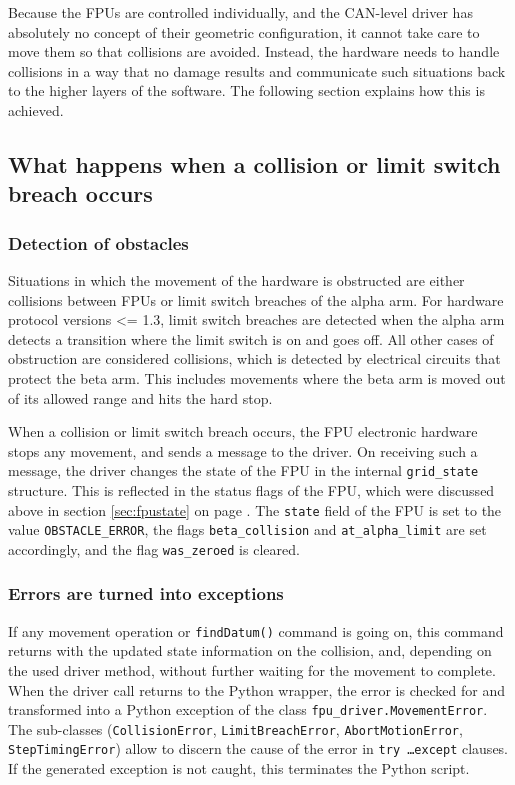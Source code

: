 \documentclass[11pt,a4paper]{scrartcl}
\begin{document}
Because the FPUs are controlled individually, and the CAN-level driver
has absolutely no concept of their geometric configuration, it cannot
take care to move them so that collisions are avoided.  Instead, the
hardware needs to handle collisions in a way that no damage results
and communicate such situations back to the higher layers of the
software. The following section explains how this is achieved.

\subsection{What happens when a collision or limit switch breach occurs}
\subsubsection{Detection of obstacles}

Situations in which the movement of the hardware is obstructed are
either collisions between FPUs or limit switch breaches of the alpha
arm. For hardware protocol versions <= 1.3, limit switch breaches are
detected when the alpha arm detects a transition where the limit
switch is on and goes off. All other cases of obstruction are
considered collisions, which is detected by electrical circuits that
protect the beta arm. This includes movements where the beta arm is
moved out of its allowed range and hits the hard stop.

When a collision or limit switch breach occurs, the FPU electronic
hardware stops any movement, and sends a message to the driver. On
receiving such a message, the driver changes the state of the FPU in
the internal \texttt{grid\_state} structure. This is reflected in the
status flags of the FPU, which were discussed above in section
\ref{sec:fpustate} on page \pageref{sec:fpustate}.  The \texttt{state}
field of the FPU is set to the value \texttt{OBSTACLE\_ERROR}, the
flags \texttt{beta\_collision} and \texttt{at\_alpha\_limit} are set
accordingly, and the flag \texttt{was\_zeroed} is cleared.


\subsubsection{Errors are turned into exceptions}

\begin{sloppypar}
If any movement operation or \texttt{findDatum()} command is going on,
this command returns with the updated state information on the
collision, and, depending on the used driver method, without further
waiting for the movement to complete.  When the driver call returns to
the Python wrapper, the error is checked for and transformed into a
Python exception of the class \texttt{fpu\_driver.MovementError}. The
sub-classes (\texttt{CollisionError}, \texttt{LimitBreachError},
\texttt{AbortMotionError}, \texttt{StepTimingError}) allow to discern
the cause of the error in \texttt{try \ldots except} clauses.  If the
generated exception is not caught, this terminates the Python script.
\end{sloppypar}
\end{document}

